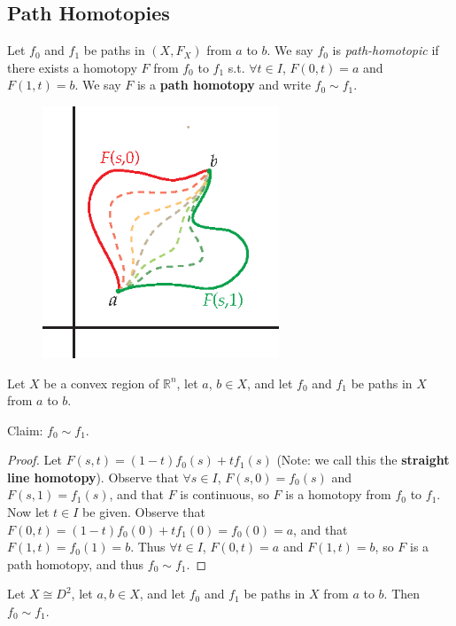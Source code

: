 \subsection{Path Homotopies} 
\begin{definition}
	Let $f_0$ and $f_1$ be paths in $(X, F_X)$ from $a$ to $b$. We say $f_0$ is \textit{path-homotopic} if there exists a homotopy $F$ from $f_0$ to $f_1$ s.t. $\forall t \in I$, $F(0,t) = a$ and $F(1, t) = b$. We say $F$ is a \textbf{path homotopy} and write $f_0 \sim f_1$. 
\end{definition}
\begin{figure}[ht!]
    \centering
    \includegraphics[width=200pt]{images/homotopy/path_homotopy}
\end{figure}
\begin{example}
	Let $X$ be a convex region of $\mathbb{R}^n$, let $a$, $b \in X$, and let $f_0$ and $f_1$ be paths in $X$ from $a$ to $b$. 
\end{example}
Claim: $f_0 \sim f_1$. 
\begin{proof}
	Let $F(s,t) = (1-t)f_0(s) + tf_1(s)$ (Note: we call this the \textbf{straight line homotopy}). Observe that $\forall s \in I$, $F(s,0) = f_0(s)$ and $F(s,1) = f_1(s)$, and that $F$ is continuous, so $F$ is a homotopy from $f_0$ to $f_1$. Now let $t \in I$ be given. Observe that $F(0,t) = (1-t)f_0(0) + tf_1(0) = f_0(0) = a$, and that $F(1, t) = f_0(1) = b$. Thus $\forall t \in I$, $F(0,t) = a$ and $F(1,t) = b$, so $F$ is a path homotopy, and thus $f_0 \sim f_1$. 
\end{proof}
\begin{example}
	Let $X \cong D^2$, let $a, b \in X$, and let $f_0$ and $f_1$ be paths in $X$ from $a$ to $b$. Then $f_0 \sim f_1$. 
\end{example}
